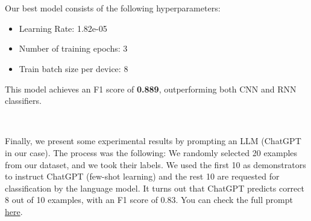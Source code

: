 \documentclass[10pt, a4paper]{article}
\begin{document}
    \ 
        
    \
    
    Our best model consists of the following hyperparameters:
    \begin{itemize}
        \item Learning Rate: 1.82e-05
        \item Number of training epochs: 3
        \item Train batch size per device: 8
        
    \end{itemize}

    This model achieves an F1 score of \textbf{0.889}, outperforming both CNN and RNN classifiers.
    \

    \

    Finally, we present some experimental results by prompting an LLM (ChatGPT in our case). The process was the following: We randomly selected 20 examples from our dataset, and we took their labels. We used the first 10 as demonstrators to instruct ChatGPT (few-shot learning) and the rest 10 are requested for classification by the language model. It turns out that ChatGPT predicts correct 8 out of 10 examples, with an F1 score of 0.83. You can check the full prompt \href{https://chat.openai.com/share/dba55d12-a18b-4ffa-9fc9-87c46a313ebc}{here}.
	
	\printbibliography
	
\end{document}
